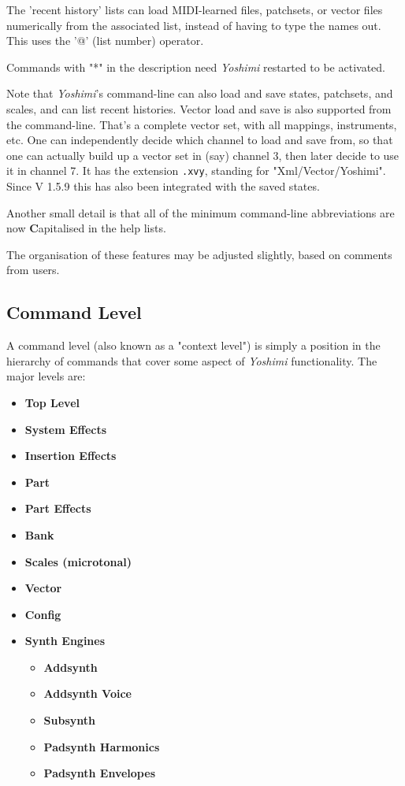    The 'recent history' lists can load MIDI-learned files, patchsets, or
   vector files numerically from the associated list, instead of having to
   type the names out.
   This uses the '@' (list number) operator.

   Commands with "*" in the description need \textsl{Yoshimi} restarted to be
   activated.

   Note that \textsl{Yoshimi}'s command-line can also load and save states,
   patchsets, and scales, and can list recent histories. Vector load and save
   is also supported from the command-line. That's a complete vector set,
   with all mappings, instruments, etc.
   One can independently decide which channel to load and save from, so that
   one can actually build up a vector set in (say) channel 3, then later
   decide to use it in channel 7. It has the extension \texttt{.xvy},
   standing for "Xml/Vector/Yoshimi".
   Since V 1.5.9 this has also been integrated with the saved states.

   Another small detail is that all of the minimum command-line abbreviations
   are now \textbf{C}apitalised in the help lists.

   The organisation of these features may be adjusted slightly, based on
   comments from users.

\subsection{Command Level}
\label{subsec:command_line_command_level}

   A command level (also known as a "context level")
   is simply a position in the hierarchy of commands that cover
   some aspect of \textsl{Yoshimi} functionality.
   The major levels are:

   \begin{itemize}
      \item \textbf{Top Level}
      \item \textbf{System Effects}
      \item \textbf{Insertion Effects}
      \item \textbf{Part}
      \item \textbf{Part Effects}
      \item \textbf{Bank}
      \item \textbf{Scales (microtonal)}
      \item \textbf{Vector}
      \item \textbf{Config}
      \item \textbf{Synth Engines}
      \begin{itemize}
         \item \textbf{Addsynth}
         \item \textbf{Addsynth Voice}
         \item \textbf{Subsynth}
         \item \textbf{Padsynth Harmonics}
         \item \textbf{Padsynth Envelopes}
      \end{itemize}
   \end{itemize}

